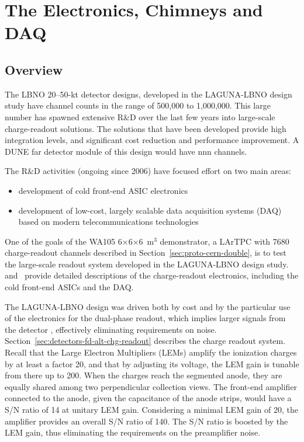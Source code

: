 \section{The Electronics, Chimneys and DAQ}
\label{sec:detectors-fd-alt-elec}

\subsection{Overview}
\label{sec:fd-alt-elec-ovvw}

The LBNO 20--50-kt detector designs, developed in the LAGUNA-LBNO
design study have channel counts in the range of 500,000 to 1,000,000.
This large number has spawned extensive R\&D over the last few years
into large-scale charge-readout solutions.  The solutions that have
been developed provide high integration levels, and significant cost
reduction and performance improvement.  A DUNE far detector module of this design would have nnn channels.

The R\&D activities (ongoing since 2006) have focused effort on two
main areas:
\begin {itemize} 
\item{development of cold front-end ASIC electronics}
\item{development of low-cost, largely scalable data 
acquisition systems (DAQ) based on modern telecommunications technologies}
\end{itemize}

One of the goals of the WA105 6$\times$6$\times$6~m$^3$ demonstrator,
a LArTPC with \num{7680} charge-readout channels described in Section~\ref{sec:proto-cern-double}, is to test the
large-scale readout system developed in the LAGUNA-LBNO design
study. \anxdualtdr{} and~\cite{WA105_SREP} provide detailed descriptions
of the charge-readout electronics, including the cold front-end ASICs
and the DAQ.

The LAGUNA-LBNO design was driven both by cost and by the particular use of the
electronics for the dual-phase readout, which implies larger signals
from the detector , effectively eliminating requirements on noise. %
Section~\ref{sec:detectors-fd-alt-chg-readout} describes
the charge readout system.  Recall that the Large Electron Multipliers (LEMs) 
amplify the ionization charges by at least a factor 20, and that by 
adjusting its voltage, the LEM gain is tunable from there
up to 200. When the charges reach the segmented anode, they are
equally shared among two perpendicular collection views.
The front-end amplifier connected to the anode, given the capacitance
of the anode strips, would have a S/N ratio of 14 at unitary LEM gain. 
Considering a minimal LEM gain of 20, the amplifier provides an
overall S/N ratio of 140. The S/N ratio is boosted by the LEM gain, thus 
eliminating the requirements on the preamplifier noise.

